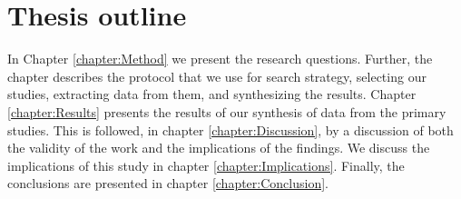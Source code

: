 \section{Thesis outline}

In Chapter \ref{chapter:Method} we present the research questions.
Further, the chapter describes the protocol that we use for search strategy, selecting our studies, extracting data from them, and synthesizing the results.
Chapter \ref{chapter:Results} presents the results of our synthesis of data from the primary studies.
This is followed, in chapter \ref{chapter:Discussion}, by a discussion of both the validity of the work and the implications of the findings.
We discuss the implications of this study in chapter \ref{chapter:Implications}.
Finally, the conclusions are presented in chapter \ref{chapter:Conclusion}. 
